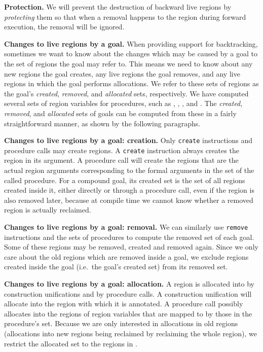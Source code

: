 \documentclass{tlp}
\newcommand{\code}[1]{{\tt#1}}
\begin{document}
\noindent\textbf{Protection.}
We will prevent the destruction of backward live regions
by \emph{protecting} them so that
when a removal happens to the region during forward execution,
the removal will be ignored.

\noindent\textbf{Changes to live regions by a goal.}
When providing support for backtracking,
sometimes we want to know about the changes which may be caused
by a goal to the set of regions the goal may refer to.
This means we need to know about
any new regions the goal creates, any live regions the goal removes,
and any live regions in which the goal performs allocations.
We refer to these sets of regions as the goal's
\emph{created}, \emph{removed}, and \emph{allocated} sets, respectively.
We have computed several sets of region variables for procedures,
such as , , , and .
The \emph{created}, \emph{removed}, and \emph{allocated} sets of goals
can be computed from these in a fairly straightforward manner,
as shown by the following paragraphs.

\noindent\textbf{Changes to live regions by a goal: creation.}
Only \code{create} instructions and procedure calls may create regions.
A \code{create} instruction always creates the region in its argument.
A procedure call will create the regions
that are the actual region arguments corresponding to the formal arguments
in the  set of the called procedure.
For a compound goal,
its created set is the set of all regions created inside it,
either directly or through a procedure call,
even if the region is also removed later,
because at compile time we cannot know
whether a removed region is actually reclaimed.

\noindent\textbf{Changes to live regions by a goal: removal.}
We can similarly use
\code{remove} instructions and the  sets of procedures
to compute the removed set of each goal.
Some of these regions may be removed, created and removed again.
Since we only care about the old regions which are removed inside a goal,
we exclude regions created inside the goal (i.e.\ the goal’s created set)
from its removed set.

\noindent\textbf{Changes to live regions by a goal: allocation.}
A region is allocated into by construction unifications and by procedure calls.
A construction unification will allocate
into the region with which it is annotated.
A procedure call possibly allocates into the regions of region variables
that are mapped to by those in the procedure's  set.
Because we are only interested in allocations in old regions
(allocations into new regions being reclaimed by reclaiming the whole region),
we restrict the allocated set
to the regions in .
\end{document}
